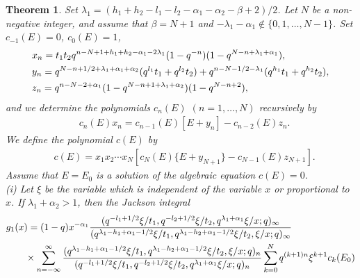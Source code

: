\documentclass[10pt,a4paper]{amsart}
\newtheorem{thm}{Theorem}
\begin{document}
\begin{thm} \label{thm:2sols}
Set $\lambda_{1} = (h_{1} + h_{2} - l_{1} - l_{2} - \alpha_{1} - \alpha_{2} - \beta + 2)/2$.
Let $N$ be a non-negative integer, and assume that $\beta = N +1 $ and $-\lambda_{1} -\alpha _1 \not \in \{ 0,1,\dots ,N-1 \}$.
Set $c_{-1}(E)=0 $,  $c_0(E)=1 $,
\begin{align}
 & x_n =t_{1}t_{2} q^{ n - N +1 + h_{1} + h_{2} - \alpha _1 - 2 \lambda _1 } (1 - q^{-n})(1 - q^{N-n + \lambda _1 + \alpha _1 }) , \label{eq:2xyz}  \\
 & y_n =  q^{N -n + 1/2 + \lambda _1 + \alpha_{1} + \alpha_{2} } (q^{l_{1}}t_{1} + q^{l_{2}}t_{2}) + q^{n- N-1/2  - \lambda _1} (q^{h_{1}}t_{1} + q^{h_{2}}t_{2})  , \notag \\
 & z_n = q^{ n - N-2 + \alpha_{1}  } (1 - q^{N -n +1 +\lambda _1 + \alpha_{2}  })(1 - q^{N- n + 2}), \notag
\end{align}
and we determine the polynomials $c_n(E)$ $(n=1,\dots ,N)$ recursively by
\begin{align}
 & c_{n} (E) x_n = c_{n - 1} (E) [E + y_n ] -c_{n-2} (E) z_n . \label{eq:2cnE}
\end{align}
We define the polynomial $c (E)$ by
\begin{align}
 & c (E) = x_1 x_2 \cdots x_{N} [ c_{N} (E) \{ E + y_{N+1} \} -c_{N-1} (E) z_{N+1} ] . \label{eq:2cE}
\end{align}
Assume that $E=E_0$ is a solution of the algebraic equation $c (E)=0$.
\\
(i) Let $\xi $ be the variable which is independent of the variable $x$ or proportional to $x$.
If  $ \lambda _{1} + \alpha _{2}  > 1$, then the Jackson integral
  \begin{align*}
    &g _1 (x) = (1 - q) x^{-\alpha_{1}} \frac{(q^{-l_{1} + 1/2}\xi/t_{1}, q^{-l_{2} + 1/2}\xi/t_{2}, q^{ \lambda _{1} + \alpha _{1} }\xi/x; q)_{\infty}}{(q^{ \lambda _{1} -h_{1} + \alpha _{1} - 1/2}\xi/t_{1}, q^{ \lambda _{1} -h_{2}+ \alpha _{1} - 1/2}\xi/t_{2}, \xi/x; q)_{\infty}} \\
    &\qquad \times \sum_{n = -\infty}^{\infty} \frac{(q^{ \lambda _{1} -h_{1} + \alpha _{1} - 1/2}\xi/t_{1}, q^{ \lambda _{1} -h_{2} + \alpha _{1} - 1/2}\xi/t_{2}, \xi/x; q)_{n}}{(q^{-l_{1} + 1/2}\xi/t_{1}, q^{-l_{2} + 1/2}\xi/t_{2}, q^{ \lambda _{1} + \alpha _{1} }\xi/x; q)_{n}} \sum_{k = 0}^{N} q^{( k+1)n} \xi^{k+1} c_{k}(E_0) \notag
  \end{align*}

\end{thm}
\end{document}
